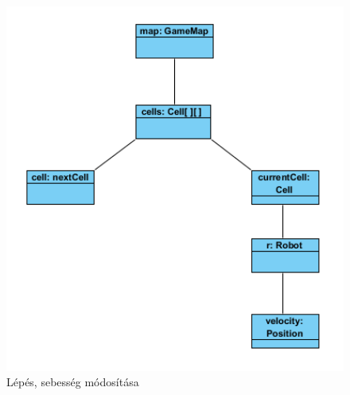 \clearpage

\begin{figure}[!htbp]
	\begin{center}
		\includegraphics[width=13cm]{./chapters/chapter05/stepobject.png}
		\caption{Lépés, sebesség módosítása}
	\end{center}
\end{figure}

\clearpage
